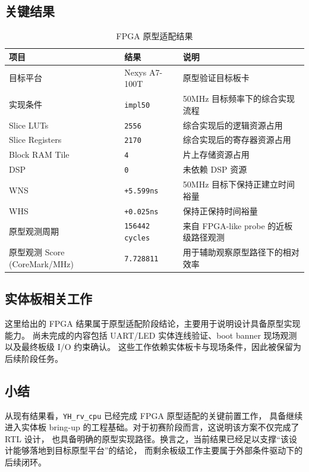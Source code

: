 \subsection{关键结果}

\begin{table}[H]
    \centering
    \small
    \caption{FPGA 原型适配结果}
    \begin{tabularx}{0.95\textwidth}{L{0.25\textwidth} L{0.22\textwidth} Y}
        \toprule
        项目 & 结果 & 说明 \\
        \midrule
        目标平台 & Nexys A7-100T & 原型验证目标板卡 \\
        实现条件 & \texttt{impl50} & 50MHz 目标频率下的综合实现流程 \\
        Slice LUTs & \texttt{2556} & 综合实现后的逻辑资源占用 \\
        Slice Registers & \texttt{2170} & 综合实现后的寄存器资源占用 \\
        Block RAM Tile & \texttt{4} & 片上存储资源占用 \\
        DSP & \texttt{0} & 未依赖 DSP 资源 \\
        WNS & \texttt{+5.599ns} & 50MHz 目标下保持正建立时间裕量 \\
        WHS & \texttt{+0.025ns} & 保持正保持时间裕量 \\
        原型观测周期 & \texttt{156442 cycles} & 来自 FPGA-like probe 的近板级路径观测 \\
        原型观测 Score (CoreMark/MHz) & \texttt{7.728811} & 用于辅助观察原型路径下的相对效率 \\
        \bottomrule
    \end{tabularx}
\end{table}

\subsection{实体板相关工作}

这里给出的 FPGA 结果属于原型适配阶段结论，主要用于说明设计具备原型实现能力。
尚未完成的内容包括 UART/LED 实体连线验证、boot banner 现场观测以及最终板级 I/O 约束确认。
这些工作依赖实体板卡与现场条件，因此被保留为后续阶段任务。

\subsection{小结}

从现有结果看，\texttt{YH\_rv\_cpu} 已经完成 FPGA 原型适配的关键前置工作，
具备继续进入实体板 bring-up 的工程基础。对于初赛阶段而言，这说明该方案不仅完成了 RTL 设计，
也具备明确的原型实现路径。换言之，当前结果已经足以支撑“该设计能够落地到目标原型平台”的结论，
而剩余板级工作主要属于外部条件驱动下的后续闭环。

